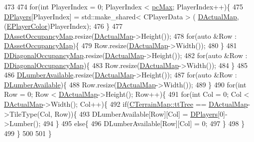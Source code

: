 \begin{DoxyCode}
473     
474     \textcolor{keywordflow}{for}(\textcolor{keywordtype}{int} PlayerIndex = 0; PlayerIndex < \hyperlink{GameDataTypes_8h_aafb0ca75933357ff28a6d7efbdd7602fa594a5c8dd3987f24e8a0f23f1a72cd34}{pcMax}; PlayerIndex++)\{
475         \hyperlink{classCGameModel_a524436c3560b10e1c6d6fdd0b66565dc}{DPlayers}[PlayerIndex] = std::make\_shared< CPlayerData > (
      \hyperlink{classCGameModel_ace04c3b62d6b71e20d1ed5460c0c3cee}{DActualMap}, (\hyperlink{GameDataTypes_8h_aafb0ca75933357ff28a6d7efbdd7602f}{EPlayerColor})PlayerIndex);
476     \}
477     \hyperlink{classCGameModel_a2207654c461a3654c6d765dd5421373f}{DAssetOccupancyMap}.resize(\hyperlink{classCGameModel_ace04c3b62d6b71e20d1ed5460c0c3cee}{DActualMap}->Height());
478     \textcolor{keywordflow}{for}(\textcolor{keyword}{auto} &Row : \hyperlink{classCGameModel_a2207654c461a3654c6d765dd5421373f}{DAssetOccupancyMap})\{
479         Row.resize(\hyperlink{classCGameModel_ace04c3b62d6b71e20d1ed5460c0c3cee}{DActualMap}->Width());
480     \}
481     \hyperlink{classCGameModel_a30e26a862e4eb282a275ed192017c248}{DDiagonalOccupancyMap}.resize(\hyperlink{classCGameModel_ace04c3b62d6b71e20d1ed5460c0c3cee}{DActualMap}->Height());
482     \textcolor{keywordflow}{for}(\textcolor{keyword}{auto} &Row : \hyperlink{classCGameModel_a30e26a862e4eb282a275ed192017c248}{DDiagonalOccupancyMap})\{
483         Row.resize(\hyperlink{classCGameModel_ace04c3b62d6b71e20d1ed5460c0c3cee}{DActualMap}->Width());
484     \}
485     
486     \hyperlink{classCGameModel_ae0bad49626fc5b7bdf8b3fe6a4187462}{DLumberAvailable}.resize(\hyperlink{classCGameModel_ace04c3b62d6b71e20d1ed5460c0c3cee}{DActualMap}->Height());
487     \textcolor{keywordflow}{for}(\textcolor{keyword}{auto} &Row : \hyperlink{classCGameModel_ae0bad49626fc5b7bdf8b3fe6a4187462}{DLumberAvailable})\{
488         Row.resize(\hyperlink{classCGameModel_ace04c3b62d6b71e20d1ed5460c0c3cee}{DActualMap}->Width());
489     \}
490     \textcolor{keywordflow}{for}(\textcolor{keywordtype}{int} Row = 0; Row < \hyperlink{classCGameModel_ace04c3b62d6b71e20d1ed5460c0c3cee}{DActualMap}->Height(); Row++)\{
491         \textcolor{keywordflow}{for}(\textcolor{keywordtype}{int} Col = 0; Col < \hyperlink{classCGameModel_ace04c3b62d6b71e20d1ed5460c0c3cee}{DActualMap}->Width(); Col++)\{
492             \textcolor{keywordflow}{if}(\hyperlink{classCTerrainMap_aff2ab991e237269941416dd79d8871d4a15600fc22dc08ff5a3aec20930112f8c}{CTerrainMap::ttTree} == \hyperlink{classCGameModel_ace04c3b62d6b71e20d1ed5460c0c3cee}{DActualMap}->TileType(Col, Row))\{
493                 DLumberAvailable[Row][Col] = \hyperlink{classCGameModel_a524436c3560b10e1c6d6fdd0b66565dc}{DPlayers}[0]->Lumber();      
494             \}
495             \textcolor{keywordflow}{else}\{
496                 DLumberAvailable[Row][Col] = 0;    
497             \}
498         \}
499     \}
500     
501 \}
\end{DoxyCode}
